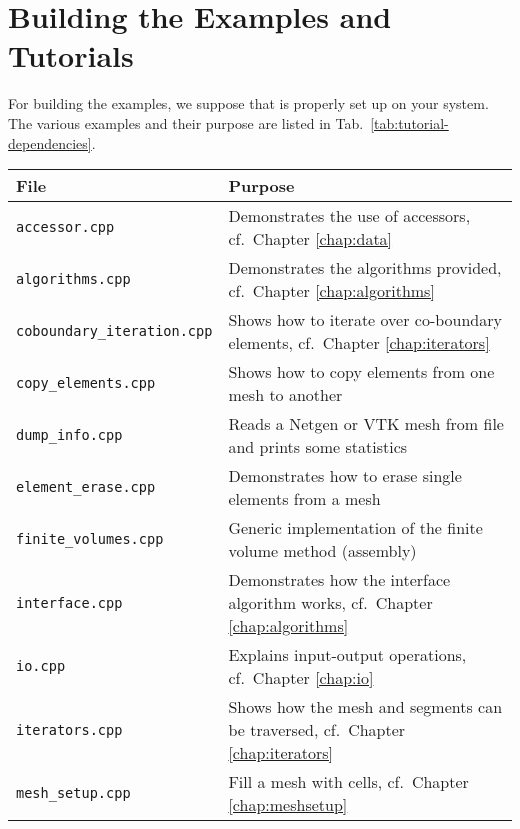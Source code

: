 \section{Building the Examples and Tutorials}
For building the examples, we suppose that {\CMake} is properly set up
on your system. The various examples and their purpose are listed in
Tab.~\ref{tab:tutorial-dependencies}.

\begin{table}[tbp]
\begin{center}
\begin{tabular}{l|p{9.3cm}}
File & Purpose\\
\hline
\texttt{accessor.cpp}              & Demonstrates the use of accessors, cf.~Chapter \ref{chap:data} \\
\texttt{algorithms.cpp}            & Demonstrates the algorithms provided, cf.~Chapter \ref{chap:algorithms} \\
\texttt{coboundary\_iteration.cpp} & Shows how to iterate over co-boundary elements, cf.~Chapter \ref{chap:iterators} \\
\texttt{copy\_elements.cpp}        & Shows how to copy elements from one mesh to another \\
\texttt{dump\_info.cpp}            & Reads a Netgen or VTK mesh from file and prints some statistics \\
\texttt{element\_erase.cpp}        & Demonstrates how to erase single elements from a mesh \\
\texttt{finite\_volumes.cpp}       & Generic implementation of the finite volume method (assembly) \\
\texttt{interface.cpp}             & Demonstrates how the interface algorithm works, cf.~Chapter \ref{chap:algorithms} \\
\texttt{io.cpp}                    & Explains input-output operations, cf.~Chapter \ref{chap:io} \\
\texttt{iterators.cpp}             & Shows how the mesh and segments can be traversed, cf.~Chapter \ref{chap:iterators} \\
\texttt{mesh\_setup.cpp}           & Fill a mesh with cells, cf.~Chapter \ref{chap:meshsetup} \\

\end{tabular}
\end{center}
\end{table}
